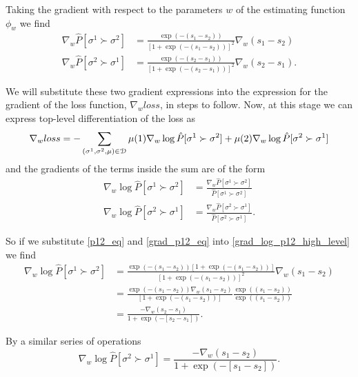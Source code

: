\begin{answer}
  Taking the gradient with respect to the parameters $w$ of the estimating function $\phi_{w}$ we find
  \begin{align}
    \nabla_{w} \hat{P}[\sigma^{1} \succ \sigma^{2}] &=  \frac{\exp(-(s_{1} - s_{2}))}{\left[1 + \exp(-(s_{1} - s_{2}))\right]^{2}} \nabla_{w}(s_{1} - s_{2})\label{grad_p12_eq} \\
    \nabla_{w} \hat{P}[\sigma^{2} \succ \sigma^{1}] &=  \frac{\exp(-(s_{2} - s_{1}))}{\left[1 + \exp(-(s_{2} - s_{1}))\right]^{2}} \nabla_{w}(s_{2} - s_{1}).
  \end{align}

  We will substitute these two gradient expressions into the expression for the gradient of the loss function, $\nabla_{w} loss$, in steps to follow.
  Now, at this stage we can express top-level differentiation of the loss as
  \begin{equation}\label{grad_loss_eq}
    \nabla_{w} loss = - \sum_{(\sigma^{1}, \sigma^{2}, \mu) \in {\cal D}} \mu(1) \nabla_{w} \log \hat{P}[\sigma^{1} \succ \sigma^{2}] + \mu(2) \nabla_{w} \log \hat{P}[\sigma^{2} \succ \sigma^{1}]
  \end{equation}
  and the gradients of the terms inside the sum are of the form
  \begin{align}
    \nabla_{w} \log \hat{P}[\sigma^{1} \succ \sigma^{2}] &= \frac{\nabla_{w} \hat{P}[\sigma^{1} \succ \sigma^{2}]}{\hat{P}[\sigma^{1} \succ \sigma^{2}]}\label{grad_log_p12_high_level} \\
    \nabla_{w} \log \hat{P}[\sigma^{2} \succ \sigma^{1}] &= \frac{\nabla_{w} \hat{P}[\sigma^{2} \succ \sigma^{1}]}{\hat{P}[\sigma^{2} \succ \sigma^{1}]}.
  \end{align}

  So if we substitute \ref{p12_eq} and \ref{grad_p12_eq} into \ref{grad_log_p12_high_level} we find
  \begin{align}
    \nabla_{w} \log \hat{P}[\sigma^{1} \succ \sigma^{2}] &= \frac{\exp(-(s_{1} - s_{2})) \left[1 + \exp(-(s_{1} - s_{2}))\right]}{\left[1 + \exp(-(s_{1} - s_{2}))\right]^{2}} \nabla_{w}(s_{1} - s_{2}) \\
    &= \frac{\exp(-(s_{1} - s_{2}))\nabla_{w}(s_{1} - s_{2})}{\left[1 + \exp(-(s_{1} - s_{2}))\right]} \frac{\exp((s_{1} - s_{2}))}{\exp((s_{1} - s_{2}))} \\
    &= \frac{-\nabla_{w}(s_{2} - s_{1})}{1 + \exp(-\left[s_{2} - s_{1}\right])}\label{grad_log_p12_eq}.
  \end{align}

  By a similar series of operations
  \begin{equation}\label{grad_log_p21_eq}
    \nabla_{w} \log \hat{P}[\sigma^{2} \succ \sigma^{1}] = \frac{-\nabla_{w}(s_{1} - s_{2})}{1 + \exp(-\left[s_{1} - s_{2}\right])}.
  \end{equation}


\end{answer}
